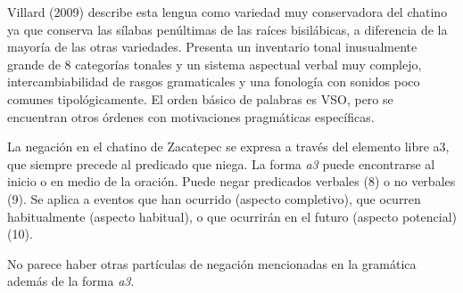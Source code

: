 Villard (2009) describe esta lengua como variedad muy conservadora del chatino ya que conserva las sílabas penúltimas de las raíces bisilábicas, a diferencia de la mayoría de las otras variedades. Presenta un inventario tonal inusualmente grande de 8 categorías tonales y un sistema aspectual verbal muy complejo, intercambiabilidad de rasgos gramaticales y una fonología con sonidos poco comunes tipológicamente. El orden básico de palabras es VSO, pero se encuentran otros órdenes con motivaciones pragmáticas específicas.

La negación en el chatino de Zacatepec se expresa a través del elemento libre a3, que siempre precede al predicado que niega. La forma \textit{a3} puede encontrarse al inicio o en medio de la oración. Puede negar predicados verbales (8) o no verbales (9). Se aplica a eventos que han ocurrido (aspecto completivo), que ocurren habitualmente (aspecto habitual), o que ocurrirán en el futuro (aspecto potencial) (10).

No parece haber otras partículas de negación mencionadas en la gramática además de la forma \textit{a3}.
